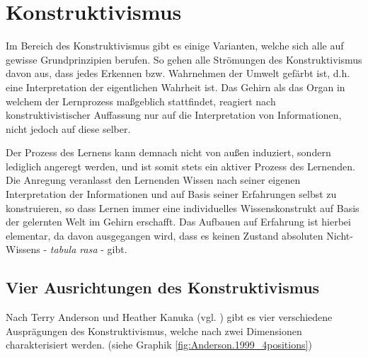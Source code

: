 \chapter{Konstruktivismus}
\label{cha:Konstruktivismus}
Im Bereich des Konstruktivismus gibt es einige Varianten, welche sich alle auf gewisse Grundprinzipien berufen. So gehen alle Strömungen des Konstruktivismus davon aus, dass jedes Erkennen bzw. Wahrnehmen der Umwelt gefärbt ist, d.h. eine Interpretation der eigentlichen Wahrheit ist. Das Gehirn als das Organ in welchem der Lernprozess maßgeblich stattfindet, reagiert nach konstruktivistischer Auffassung nur auf die Interpretation von Informationen, nicht jedoch auf diese selber. \cite{Reinmann.2013} %

Der Prozess des Lernens kann demnach nicht von außen induziert, sondern lediglich angeregt werden, und ist somit stets ein aktiver Prozess des Lernenden.  \cite{Reinmann.2013} %
Die Anregung veranlasst den Lernenden Wissen nach seiner eigenen Interpretation der Informationen und auf Basis seiner Erfahrungen selbst zu konstruieren, so dass Lernen immer eine individuelles Wissenskonstrukt auf Basis der gelernten Welt im Gehirn erschafft. \cite{Edelmann.2012} Das Aufbauen auf Erfahrung ist hierbei elementar, da davon ausgegangen wird, dass es keinen Zustand absoluten Nicht-Wissens - \emph{tabula rasa} - gibt. \cite{Anderson.1999} %

\section{Vier Ausrichtungen des Konstruktivismus}
\label{sec:Konstr_4positions}

Nach Terry Anderson und Heather Kanuka (vgl. \cite{Anderson.1999}) gibt es vier verschiedene Ausprägungen des Konstruktivismus, welche nach zwei Dimensionen charakterisiert werden. (siehe Graphik \ref{fig:Anderson.1999_4positions})


